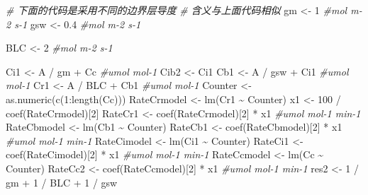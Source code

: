 \documentclass[
]{krantz}
\makeatletter
\newenvironment{Shaded}{\begin{snugshade}}{\end{snugshade}}
\newcommand{\CommentTok}[1]{\textcolor[rgb]{0.56,0.35,0.01}{\textit{#1}}}
\newcommand{\DecValTok}[1]{\textcolor[rgb]{0.00,0.00,0.81}{#1}}
\newcommand{\FloatTok}[1]{\textcolor[rgb]{0.00,0.00,0.81}{#1}}
\newcommand{\FunctionTok}[1]{\textcolor[rgb]{0.00,0.00,0.00}{#1}}
\newcommand{\NormalTok}[1]{#1}
\newcommand{\OtherTok}[1]{\textcolor[rgb]{0.56,0.35,0.01}{#1}}
\newcommand{\SpecialCharTok}[1]{\textcolor[rgb]{0.00,0.00,0.00}{#1}}
\newenvironment{kframe}{%
\medskip{}
\setlength{\fboxsep}{.8em}
 \def\at@end@of@kframe{}%
 \ifinner\ifhmode%
  \def\at@end@of@kframe{\end{minipage}}%
  \begin{minipage}{\columnwidth}%
 \fi\fi%
 \def\FrameCommand##1{\hskip\@totalleftmargin \hskip-\fboxsep
 \colorbox{shadecolor}{##1}\hskip-\fboxsep
     \hskip-\linewidth \hskip-\@totalleftmargin \hskip\columnwidth}%
 \MakeFramed {\advance\hsize-\width
   \@totalleftmargin\z@ \linewidth\hsize
   \@setminipage}}%
 {\par\unskip\endMakeFramed%
 \at@end@of@kframe}
\renewenvironment{Shaded}{\begin{kframe}}{\end{kframe}}
\makeatother
\begin{document}
\begin{Shaded}
\begin{Highlighting}[]
\CommentTok{\# 下面的代码是采用不同的边界层导度}
\CommentTok{\# 含义与上面代码相似}
\NormalTok{gm }\OtherTok{\textless{}{-}} \DecValTok{1} \CommentTok{\#mol m{-}2 s{-}1}
\NormalTok{gsw }\OtherTok{\textless{}{-}} \FloatTok{0.4} \CommentTok{\#mol m{-}2 s{-}1}

\NormalTok{BLC }\OtherTok{\textless{}{-}} \DecValTok{2} \CommentTok{\#mol m{-}2 s{-}1}

\NormalTok{Ci1 }\OtherTok{\textless{}{-}}\NormalTok{ A }\SpecialCharTok{/}\NormalTok{ gm }\SpecialCharTok{+}\NormalTok{ Cc }\CommentTok{\#umol mol{-}1}
\NormalTok{Cib2 }\OtherTok{\textless{}{-}}\NormalTok{ Ci1}
\NormalTok{Cb1 }\OtherTok{\textless{}{-}}\NormalTok{ A }\SpecialCharTok{/}\NormalTok{ gsw }\SpecialCharTok{+}\NormalTok{ Ci1 }\CommentTok{\#umol mol{-}1}
\NormalTok{Cr1 }\OtherTok{\textless{}{-}}\NormalTok{ A }\SpecialCharTok{/}\NormalTok{ BLC }\SpecialCharTok{+}\NormalTok{ Cb1 }\CommentTok{\#umol mol{-}1}
\NormalTok{Counter }\OtherTok{\textless{}{-}} \FunctionTok{as.numeric}\NormalTok{(}\FunctionTok{c}\NormalTok{(}\DecValTok{1}\SpecialCharTok{:}\FunctionTok{length}\NormalTok{(Cc)))}
\NormalTok{RateCrmodel }\OtherTok{\textless{}{-}} \FunctionTok{lm}\NormalTok{(Cr1 }\SpecialCharTok{\textasciitilde{}}\NormalTok{ Counter)}
\NormalTok{x1 }\OtherTok{\textless{}{-}} \DecValTok{100} \SpecialCharTok{/} \FunctionTok{coef}\NormalTok{(RateCrmodel)[}\DecValTok{2}\NormalTok{]}
\NormalTok{RateCr1 }\OtherTok{\textless{}{-}} \FunctionTok{coef}\NormalTok{(RateCrmodel)[}\DecValTok{2}\NormalTok{] }\SpecialCharTok{*}\NormalTok{ x1 }\CommentTok{\#umol mol{-}1 min{-}1}
\NormalTok{RateCbmodel }\OtherTok{\textless{}{-}} \FunctionTok{lm}\NormalTok{(Cb1 }\SpecialCharTok{\textasciitilde{}}\NormalTok{ Counter)}
\NormalTok{RateCb1 }\OtherTok{\textless{}{-}} \FunctionTok{coef}\NormalTok{(RateCbmodel)[}\DecValTok{2}\NormalTok{] }\SpecialCharTok{*}\NormalTok{ x1 }\CommentTok{\#umol mol{-}1 min{-}1}
\NormalTok{RateCimodel }\OtherTok{\textless{}{-}} \FunctionTok{lm}\NormalTok{(Ci1 }\SpecialCharTok{\textasciitilde{}}\NormalTok{ Counter)}
\NormalTok{RateCi1 }\OtherTok{\textless{}{-}} \FunctionTok{coef}\NormalTok{(RateCimodel)[}\DecValTok{2}\NormalTok{] }\SpecialCharTok{*}\NormalTok{ x1 }\CommentTok{\#umol mol{-}1 min{-}1}
\NormalTok{RateCcmodel }\OtherTok{\textless{}{-}} \FunctionTok{lm}\NormalTok{(Cc }\SpecialCharTok{\textasciitilde{}}\NormalTok{ Counter)}
\NormalTok{RateCc2 }\OtherTok{\textless{}{-}} \FunctionTok{coef}\NormalTok{(RateCcmodel)[}\DecValTok{2}\NormalTok{] }\SpecialCharTok{*}\NormalTok{ x1 }\CommentTok{\#umol mol{-}1 min{-}1}
\NormalTok{res2 }\OtherTok{\textless{}{-}} \DecValTok{1} \SpecialCharTok{/}\NormalTok{ gm }\SpecialCharTok{+} \DecValTok{1} \SpecialCharTok{/}\NormalTok{ BLC }\SpecialCharTok{+} \DecValTok{1} \SpecialCharTok{/}\NormalTok{ gsw}


\end{Highlighting}
\end{Shaded}
\end{document}
